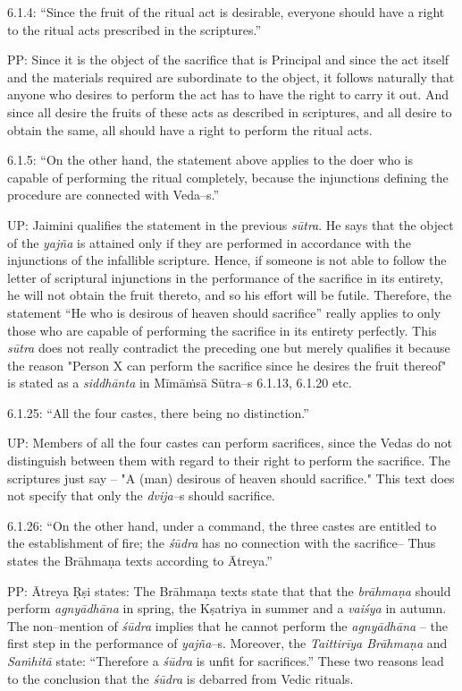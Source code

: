 6.1.4: “Since the fruit of the ritual act is desirable, everyone should have a right to the ritual acts prescribed in the scriptures.”

PP: Since it is the object of the sacrifice that is Principal and since the act itself and the materials required are subordinate to the object, it follows naturally that anyone who desires to perform the act has to have the right to carry it out. And since all desire the fruits of these acts as described in scriptures, and all desire to obtain the same, all should have a right to perform the ritual acts.

6.1.5: “On the other hand, the statement above applies to the doer who is capable of performing the ritual completely, because the injunctions defining the procedure are connected with Veda–s.”

UP: Jaimini qualifies the statement in the previous \textit{sūtra}. He says that the object of the \textit{yajña} is attained only if they are performed in accordance with the injunctions of the infallible scripture. Hence, if someone is not able to follow the letter of scriptural injunctions in the performance of the sacrifice in its entirety, he will not obtain the fruit thereto, and so his effort will be futile. Therefore, the statement “He who is desirous of heaven should sacrifice” really applies to only those who are capable of performing the sacrifice in its entirety perfectly. This \textit{sūtra} does not really contradict the preceding one but merely qualifies it because the reason "Person X can perform the sacrifice since he desires the fruit thereof" is stated as a \textit{siddhānta} in Mīmāṁsā Sūtra–s 6.1.13, 6.1.20 etc.

6.1.25: “All the four castes, there being no distinction.”

UP: Members of all the four castes can perform sacrifices, since the Vedas do not distinguish between them with regard to their right to perform the sacrifice. The scriptures just say – "A (man) desirous of heaven should sacrifice." This text does not specify that only the \textit{dvija–}s should sacrifice.

6.1.26: “On the other hand, under a command, the three castes are entitled to the establishment of fire; the \textit{śūdra} has no connection with the sacrifice– Thus states the Brāhmaṇa texts according to Ātreya.”

PP: Ātreya Ṛṣi states: The Brāhmaṇa texts state that that the \textit{brāhmaṇa} should perform \textit{agnyādhāna} in spring, the Kṣatriya in summer and a \textit{vaiśya} in autumn. The non–mention of \textit{śūdra} implies that he cannot perform the \textit{agnyādhāna} – the first step in the performance of \textit{yajña}–s. Moreover, the \textit{Taittirīya Brāhmaṇa} and \textit{Saṁhitā} state: “Therefore a \textit{śūdra} is unfit for sacrifices.” These two reasons lead to the conclusion that the \textit{śūdra} is debarred from Vedic rituals.

